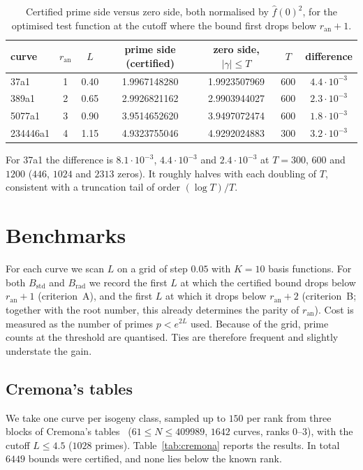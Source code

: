 \documentclass[11pt]{amsart}
\theoremstyle{remark}
\theoremstyle{definition}
\newcommand{\ran}{r_{\mathrm{an}}}
\begin{document}
\begin{table}[h]
\centering\small
\begin{tabular}{lcccccc}
\toprule
curve & $\ran$ & $L$ & prime side (certified) & zero side, $|\gamma|\le T$ & $T$ & difference\\
\midrule
37a1     & 1 & 0.40 & 1.9967148280 & 1.9923507969 & 600 & $4.4\cdot10^{-3}$\\
389a1    & 2 & 0.65 & 2.9926821162 & 2.9903944027 & 600 & $2.3\cdot10^{-3}$\\
5077a1   & 3 & 0.90 & 3.9514652620 & 3.9497072474 & 600 & $1.8\cdot10^{-3}$\\
234446a1 & 4 & 1.15 & 4.9323755046 & 4.9292024883 & 300 & $3.2\cdot10^{-3}$\\
\bottomrule
\end{tabular}
\caption{Certified prime side versus zero side, both normalised by $\hat f(0)^2$, for the optimised test function at the cutoff where the bound first drops below $\ran+1$.}
\label{tab:zeros}
\end{table}

For 37a1 the difference is $8.1\cdot10^{-3}$, $4.4\cdot10^{-3}$ and $2.4\cdot10^{-3}$ at $T=300$, $600$ and $1200$ ($446$, $1024$ and $2313$ zeros). It roughly halves with each doubling of $T$, consistent with a truncation tail of order $(\log T)/T$.

\section{Benchmarks}\label{sec:bench}

For each curve we scan $L$ on a grid of step $0.05$ with $K=10$ basis functions. For both $B_{\mathrm{std}}$ and $B_{\mathrm{rad}}$ we record the first $L$ at which the certified bound drops below $\ran+1$ (criterion~A), and the first $L$ at which it drops below $\ran+2$ (criterion~B; together with the root number, this already determines the parity of $\ran$). Cost is measured as the number of primes $p<e^{2L}$ used. Because of the grid, prime counts at the threshold are quantised. Ties are therefore frequent and slightly understate the gain.

\subsection{Cremona's tables}
We take one curve per isogeny class, sampled up to $150$ per rank from three blocks of Cremona's tables~\cite{Cremona} ($61\le N\le 409989$, $1642$ curves, ranks $0$--$3$), with the cutoff $L\le 4.5$ ($1028$ primes). Table~\ref{tab:cremona} reports the results. In total $6449$ bounds were certified, and none lies below the known rank.
\end{document}
